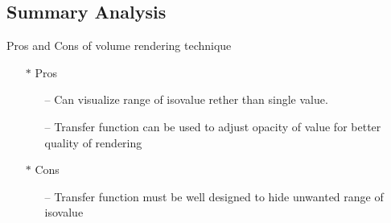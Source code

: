\documentclass[11pt]{article}
\begin{document}
\subsection*{Summary Analysis}

Pros and Cons of volume rendering technique

\begin{itemize}

\item [$\ast$] Pros

\begin{itemize}

\item [--] Can visualize range of isovalue rether than single value.
\item [--] Transfer function can be used to adjust opacity of value for better quality of rendering

\end{itemize}

\item [$\ast$] Cons

\begin{itemize}

\item [--] Transfer function must be well designed to hide unwanted range of isovalue

\end{itemize}

\end{itemize}
\end{document}
